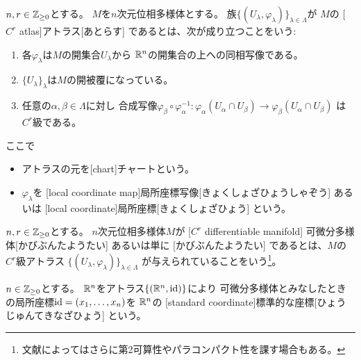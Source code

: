 \documentclass[report]{jlreq}
\begin{document}
\begin{definition}[アトラス]
    $n, r \in \mathbb{Z}_{\ge 0}$とする。
    $M$を$n$次元位相多様体とする。
    族$\{ (U_\lambda, \varphi_\lambda) \}_{\lambda \in \Lambda}$が
    $M$の
    [$C^r$ atlas]{アトラス}[あとらす]
    であるとは、次が成り立つことをいう:
    \begin{enumerate}
        \item 各$\varphi_\lambda$は$M$の開集合$U_\lambda$から
            $\mathbb{R}^n$の開集合の上への同相写像である。
        \item $\{U_\lambda\}_\lambda$は$M$の開被覆になっている。
        \item 任意の$\alpha, \beta \in \Lambda$に対し
            合成写像$\varphi_\beta \circ \varphi_\alpha^{-1}
                \colon \varphi_\alpha(U_\alpha \cap U_\beta)
                \to \varphi_\beta(U_\alpha \cap U_\beta)$
            は$C^r$級である。
    \end{enumerate}
    ここで
    \begin{itemize}
        \item アトラスの元を[chart]{チャート}という。
        \item $\varphi_\lambda$を
            [local coordinate map]{局所座標写像}[きょくしょざひょうしゃぞう]
            あるいは
            [local coordinate]{局所座標}[きょくしょざひょう]
            という。
    \end{itemize}
\end{definition}

\begin{definition}[可微分構造]
    \TODO{}
\end{definition}

\begin{definition}[可微分多様体]
    $n, r \in \mathbb{Z}_{\ge 0}$とする。
    $n$次元位相多様体$M$が
        [$C^r$ differentiable manifold]
        {可微分多様体}[かびぶんたようたい]
    あるいは単に
    [かびぶんたようたい]
    であるとは、$M$の$C^r$級アトラス
    $\{ (U_\lambda, \varphi_\lambda) \}_{\lambda \in \Lambda}$
    が与えられていることをいう\footnote{
        文献によってはさらに第2可算性やパラコンパクト性を課す場合もある。
    }。
\end{definition}

\begin{definition}[標準的な座標]
    $n \in \mathbb{Z}_{\ge 0}$とする。
    $\mathbb{R}^n$をアトラス$\{ (\mathbb{R}^n, \mathrm{id}) \}$により
    可微分多様体とみなしたときの局所座標$\mathrm{id} = (x_1, \dots, x_n)$を
    $\mathbb{R}^n$の
    [standard coordinate]{標準的な座標}[ひょうじゅんてきなざひょう]
    という。
\end{definition}
\end{document}
